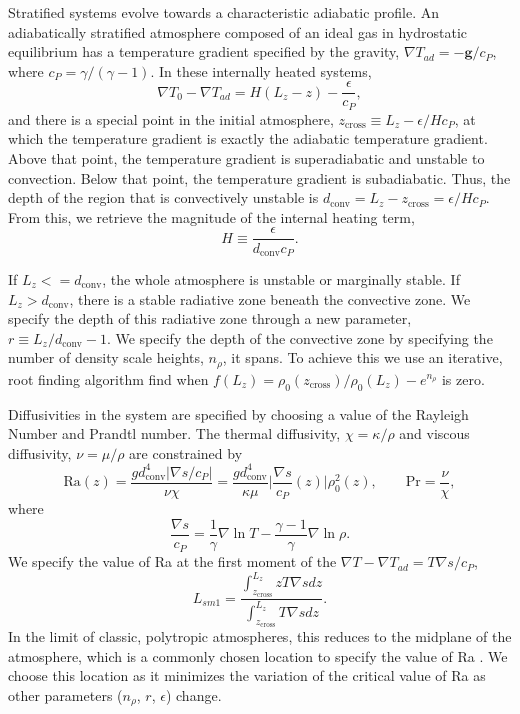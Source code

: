 \documentclass[aps, pre, onecolumn, nofootinbib, notitlepage, groupedaddress, amsfonts, amssymb, amsmath, longbibliography]{revtex4-1}
\newcommand{\grad}{\ensuremath{\nabla}}
\begin{document}
Stratified systems evolve towards a characteristic adiabatic profile.  An adiabatically
stratified atmosphere composed of an ideal gas in hydrostatic equilibrium has a
temperature gradient specified by the gravity, $\grad T_{ad} = -\bm{g} / c_P$, where
$c_P = \gamma/(\gamma-1)$.  In these internally heated systems,
\begin{equation}
\grad T_0 - \grad T_{ad} = H(L_z - z) - \frac{\epsilon}{c_P},
\end{equation}
and there is a special point in the initial atmosphere, $z_{\text{cross}} \equiv L_z - \epsilon / H c_P$,
at which the temperature gradient is exactly the adiabatic temperature gradient.  Above that point,
the temperature gradient is superadiabatic and unstable to convection.  Below that point,
the temperature gradient is subadiabatic.  Thus, the depth of the region that is convectively
unstable is $d_{\text{conv}} = L_z - z_{\text{cross}} = \epsilon / H c_P$.  From this,
we retrieve the magnitude of the internal heating term,
\begin{equation}
H \equiv \frac{\epsilon}{d_{\text{conv}} c_P}.
\end{equation}

If $L_z <= d_{\text{conv}}$, the whole atmosphere is unstable or marginally stable.
If $L_z > d_{\text{conv}}$, there is a stable radiative zone beneath the convective
zone.  We specify the depth of this radiative zone through a new parameter,
$r \equiv L_z/d_{\text{conv}} - 1$.  We specify the depth of the convective zone by
specifying the number of density scale heights, $n_\rho$, it spans.  To achieve this we
use an iterative, root finding algorithm find when
$f(L_z) = \rho_0(z_{\text{cross}})/\rho_0(L_z) -  e^{n_\rho}$ is zero.

Diffusivities in the system are specified by choosing a value of the Rayleigh
Number and Prandtl number.  The thermal diffusivity, $\chi = \kappa / \rho$ and
viscous diffusivity, $\nu = \mu / \rho$ are constrained by
\begin{equation}
\text{Ra}(z) = \frac{g d_{\text{conv}}^4 \bigg|\grad s / c_P\bigg|}{\nu\chi} = 
\frac{g d_{\text{conv}}^4}{\kappa\mu}\bigg|\frac{\grad s}{c_P}(z)\bigg|\rho_0^2(z),\qquad
\text{Pr} = \frac{\nu}{\chi},
\end{equation}
where 
\begin{equation}
\frac{\grad s}{c_P} = \frac{1}{\gamma} \grad\ln T - \frac{\gamma-1}{\gamma} \grad \ln \rho.
\end{equation}
We specify the value of Ra at the first moment of the $\grad T - \grad T_{ad} = T \grad s / c_P$,
\begin{equation}
L_{sm1} = \frac{\int_{z_{\text{cross}}}^{L_z} z T\grad s dz}{\int_{z_{\text{cross}}}^{L_z} T\grad s dz}.
\end{equation}
In the limit of classic, polytropic atmospheres, this reduces to the midplane of the atmosphere,
which is a commonly chosen location to specify the value of Ra \citep{hurlburt&all1984}.  We choose this location as it
minimizes the variation of the critical value of Ra as other parameters ($n_\rho$, $r$, $\epsilon$)
change.
\end{document}
